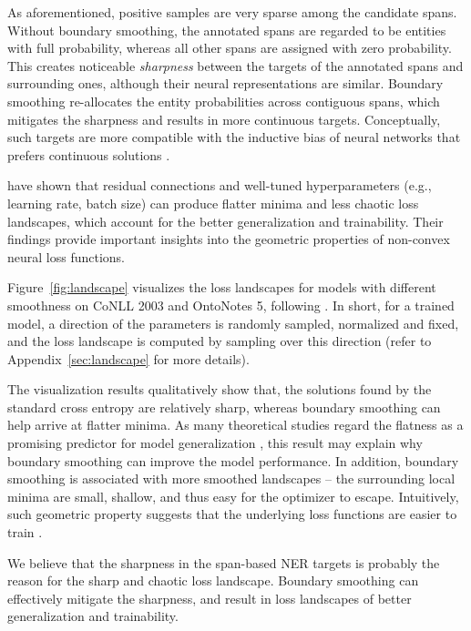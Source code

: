 \documentclass[11pt]{article}
\begin{document}
As aforementioned, positive samples are very sparse among the candidate spans. Without boundary smoothing, the annotated spans are regarded to be entities with full probability, whereas all other spans are assigned with zero probability. This creates noticeable \emph{sharpness} between the targets of the annotated spans and surrounding ones, although their neural representations are similar. Boundary smoothing re-allocates the entity probabilities across contiguous spans, which mitigates the sharpness and results in more continuous targets. Conceptually, such targets are more compatible with the inductive bias of neural networks that prefers continuous solutions \citep{hornik1989multilayer}. 

\citet{li2018visualizing} have shown that residual connections and well-tuned hyperparameters (e.g., learning rate, batch size) can produce flatter minima and less chaotic loss landscapes, which account for the better generalization and trainability. Their findings provide important insights into the geometric properties of non-convex neural loss functions. 

Figure~\ref{fig:landscape} visualizes the loss landscapes for models with different smoothness  on CoNLL 2003 and OntoNotes 5, following \citet{li2018visualizing}. In short, for a trained model, a direction of the parameters is randomly sampled, normalized and fixed, and the loss landscape is computed by sampling over this direction (refer to Appendix~\ref{sec:landscape} for more details). 


The visualization results qualitatively show that, the solutions found by the standard cross entropy are relatively sharp, whereas boundary smoothing can help arrive at flatter minima. As many theoretical studies regard the flatness as a promising predictor for model generalization \citep{hochreiter1997flat,jiang2019fantastic}, this result may explain why boundary smoothing can improve the model performance. In addition, boundary smoothing is associated with more smoothed landscapes -- the surrounding local minima are small, shallow, and thus easy for the optimizer to escape. Intuitively, such geometric property suggests that the underlying loss functions are easier to train \citep{li2018visualizing}. 

We believe that the sharpness in the span-based NER targets is probably the reason for the sharp and chaotic loss landscape. Boundary smoothing can effectively mitigate the sharpness, and result in loss landscapes of better generalization and trainability. 
\end{document}
